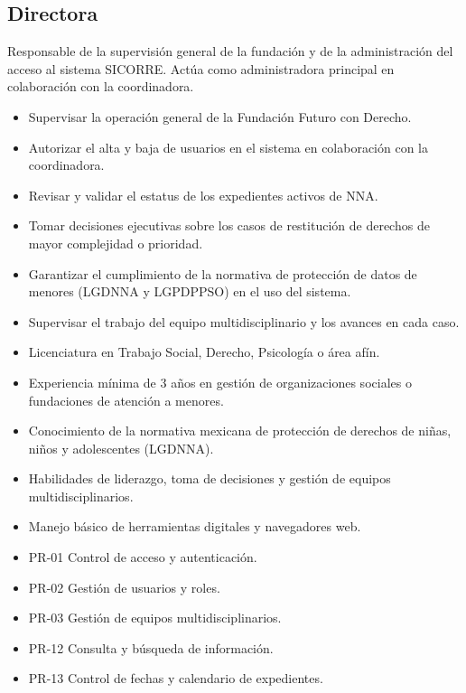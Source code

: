 \begin{Usuario}{\hypertarget{A.Directora}{\hypertarget{Actor.Administrador}{\subsection{Directora}}}}{
		Responsable de la supervisión general de la fundación y de la 
		administración del acceso al sistema SICORRE. Actúa como administradora 
		principal en colaboración con la coordinadora.
	}
	\item[Responsabilidades:] \cdtEmpty
	\begin{itemize}
		\item Supervisar la operación general de la Fundación Futuro con Derecho.
		\item Autorizar el alta y baja de usuarios en el sistema en colaboración 
		con la coordinadora.
		\item Revisar y validar el estatus de los expedientes activos de NNA.
		\item Tomar decisiones ejecutivas sobre los casos de restitución de 
		derechos de mayor complejidad o prioridad.
		\item Garantizar el cumplimiento de la normativa de protección de datos 
		de menores (LGDNNA y LGPDPPSO) en el uso del sistema.
		\item Supervisar el trabajo del equipo multidisciplinario y los avances 
		en cada caso.
	\end{itemize}
	
	\item[Perfil:] \cdtEmpty
	\begin{itemize}
		\item Licenciatura en Trabajo Social, Derecho, Psicología o área afín.
		\item Experiencia mínima de 3 años en gestión de organizaciones sociales 
		o fundaciones de atención a menores.
		\item Conocimiento de la normativa mexicana de protección de derechos 
		de niñas, niños y adolescentes (LGDNNA).
		\item Habilidades de liderazgo, toma de decisiones y gestión de equipos 
		multidisciplinarios.
		\item Manejo básico de herramientas digitales y navegadores web.
	\end{itemize}
	
	\item[Procesos en los que participa:] \cdtEmpty
	\begin{itemize}
		\item PR-01 Control de acceso y autenticación.
		\item PR-02 Gestión de usuarios y roles.
		\item PR-03 Gestión de equipos multidisciplinarios.
		\item PR-12 Consulta y búsqueda de información.
		\item PR-13 Control de fechas y calendario de expedientes.
	\end{itemize}
	

\end{Usuario}
